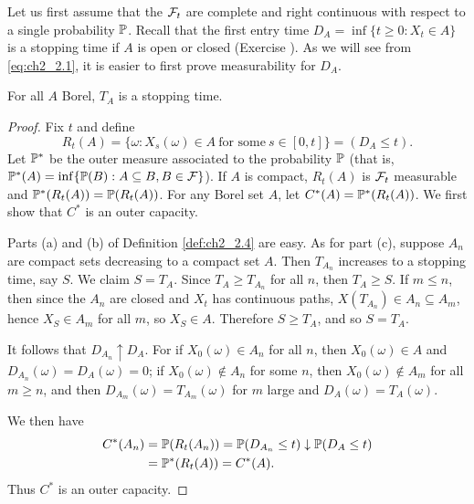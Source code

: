 
Let us first assume that the $\FC_t$ are complete and right continuous with respect to a single probability $\P$. Recall that the first entry time $D_A = \inf\{t \geq 0 : X_t \in A\}$ is a stopping time if $A$ is open or closed (Exercise ). As we will see from \eqref{eq:ch2_2.1}, it is easier to first prove measurability for $D_A$.

\begin{theorem}\label{thm:ch2_2.8}
For all $A$ Borel, $T_A$ is a stopping time.
\end{theorem}

\begin{proof}
Fix $t$ and define
\begin{equation}\label{eq:ch2_2.1}
    R_t(A) = \{\omega : X_s(\omega) \in A~\text{for some}~s \in [0,t]\} = (D_A \leq t).
\end{equation}
Let $\P^*$ be the outer measure associated to the probability $\P$ (that is, $\P^*(A) = \inf\{\P(B) : A \subseteq B, B \in \FC\}$). If $A$ is compact, $R_t(A)$ is $\FC_t$ measurable and $\P^*(R_t(A)) = \P(R_t(A))$. For any Borel set $A$, let $C^*(A) = \P^*(R_t(A))$. We first show that $C^*$ is an outer capacity.

Parts (a) and (b) of Definition \ref{def:ch2_2.4} are easy. As for part (c), suppose $A_n$ are compact sets decreasing to a compact set $A$. Then $T_{A_n}$ increases to a stopping time, say $S$. We claim $S = T_A$. Since $T_A \geq T_{A_n}$ for all $n$, then $T_A \geq S$. If $m \leq n$, then since the $A_n$ are closed and $X_t$ has continuous paths, $X(T_{A_n}) \in A_n \subseteq A_m$, hence $X_S \in A_m$ for all $m$, so $X_S \in A$. Therefore $S \geq T_A$, and so $S = T_A$.

It follows that $D_{A_n} \uparrow D_A$. For if $X_0(\omega) \in A_n$ for all $n$, then $X_0(\omega) \in A$ and $D_{A_n}(\omega) = D_A(\omega) = 0$; if $X_0(\omega) \notin A_n$ for some $n$, then $X_0(\omega) \notin A_m$ for all $m \geq n$, and then $D_{A_m}(\omega) = T_{A_m}(\omega)$ for $m$ large and $D_A(\omega) = T_A(\omega)$.

We then have
\begin{align*}
    C^*(A_n) &= \P(R_t(A_n)) = \P(D_{A_n} \leq t) \downarrow \P(D_A \leq t) \\
    &= \P^*(R_t(A)) = C^*(A).
\end{align*}
Thus $C^*$ is an outer capacity.


\end{proof}
